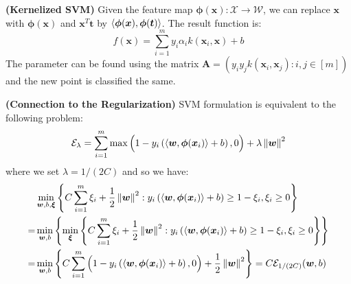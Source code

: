 \begin{definition}{\textbf{(Kernelized SVM)}}
    Given the feature map $\boldsymbol \phi(\boldsymbol x) : \mathcal{X} \rightarrow \mathcal{W}$, we can replace $\boldsymbol x$ with $\boldsymbol \phi(\boldsymbol x)$ and $\boldsymbol x^T\boldsymbol t$ by $\left\langle \boldsymbol \phi(\boldsymbol x), \boldsymbol \phi(\boldsymbol t) \right\rangle$. The result function is:
    \begin{equation*}
        f(\boldsymbol x) = \sum^m_{i=1}y_i\alpha_i k(\boldsymbol x_i, \boldsymbol x) + b
    \end{equation*}
    The parameter can be found using the matrix $\boldsymbol A = (y_iy_jk(\boldsymbol x_i, \boldsymbol x_j) : i, j \in[m])$ and the new point is classified the same. 
\end{definition}

\begin{remark}{\textbf{(Connection to the Regularization)}}
    SVM formulation is equivalent to the following problem:
    \begin{equation*}
        \mathcal{E}_\lambda = \sum^m_{i=1} \max\Big( 1 - y_i\left( \left\langle \boldsymbol w, \boldsymbol \phi(\boldsymbol x_i) \right\rangle + b \right), 0 \Big) + \lambda\left\lVert\boldsymbol w\right\rVert^2
    \end{equation*}
    where we set $\lambda = 1/(2C)$ and so we have:
    \begin{equation*}
    \begin{aligned}
        &\min_{\boldsymbol w, b, \boldsymbol \xi} \left\{ C\sum^m_{i=1} \xi_i + \frac{1}{2}\left\lVert\boldsymbol w\right\rVert^2 : y_i\left( \left\langle \boldsymbol w, \boldsymbol \phi(\boldsymbol x_i) \right\rangle + b  \right) \ge 1 - \xi_i, \xi_i\ge0 \right\} \\
        =&\min_{\boldsymbol w, b} \left\{ \min_{\boldsymbol \xi}\left\{ C\sum^m_{i=1} \xi_i + \frac{1}{2}\left\lVert\boldsymbol w\right\rVert^2 : y_i\left( \left\langle \boldsymbol w, \boldsymbol \phi(\boldsymbol x_i) \right\rangle + b  \right) \ge 1 - \xi_i, \xi_i\ge0 \right\} \right\} \\
        =&\min_{\boldsymbol w, b} \left\{ C\sum^m_{i=1} \Big( 1 - y_i\left( \left\langle \boldsymbol w, \boldsymbol \phi(\boldsymbol x_i) \right\rangle + b \right), 0 \Big) + \frac{1}{2}\left\lVert\boldsymbol w\right\rVert^2 \right\} = C\mathcal{E}_{1/(2C)}(\boldsymbol w, b)
    \end{aligned}
    \end{equation*}
\end{remark}

